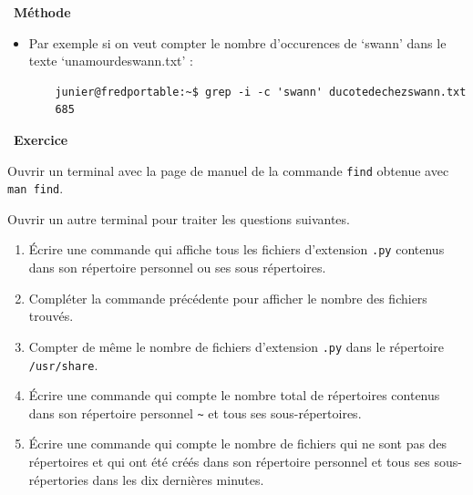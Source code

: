\documentclass[
  11pt,
]{article}
\newcounter{exo}
\newenvironment{exercice}[1]
{\par \medskip   \addtocounter{exo}{1} \noindent  
\begin{bclogo}[arrondi =0.1,   noborder = true, logo=\bccrayon, marge=4]{~\textbf{Exercice} \textbf{\theexo} {\itshape #1} }  \par}
{
\end{bclogo}
 \par \bigskip }
\newcounter{def}
\newenvironment{methode}[1]
{\par \medskip    \noindent  
 \begin {bclogo}[arrondi =0.1,logo=\bcoutil, marge=4,noborder = true] {~\textbf{Méthode}   {\itshape #1} }  \par}
{
\end{bclogo}
 \par \bigskip }
\begin{document}
\begin{methode}{}
\begin{itemize}
\item
  Par exemple si on veut compter le nombre d'occurences de `swann' dans
  le texte `unamourdeswann.txt' :

\begin{verbatim}
    junier@fredportable:~$ grep -i -c 'swann' ducotedechezswann.txt
    685
\end{verbatim}
\end{itemize}

\end{methode}

\begin{exercice}{}

Ouvrir un terminal avec la page de manuel de la commande \texttt{find}
obtenue avec \texttt{man\ find}.

Ouvrir un autre terminal pour traiter les questions suivantes.

\begin{enumerate}
\def\labelenumi{\arabic{enumi}.}
\item
  Écrire une commande qui affiche tous les fichiers d'extension
  \texttt{.py} contenus dans son répertoire personnel ou ses sous
  répertoires.
\item
  Compléter la commande précédente pour afficher le nombre des fichiers
  trouvés.
\item
  Compter de même le nombre de fichiers d'extension \texttt{.py} dans le
  répertoire \texttt{/usr/share}.
\item
  Écrire une commande qui compte le nombre total de répertoires contenus
  dans son répertoire personnel \texttt{\textasciitilde{}} et tous ses
  sous-répertoires.
\item
  Écrire une commande qui compte le nombre de fichiers qui ne sont pas
  des répertoires et qui ont été créés dans son répertoire personnel et
  tous ses sous-répertories dans les dix dernières minutes.
\end{enumerate}

\end{exercice}
\end{document}
